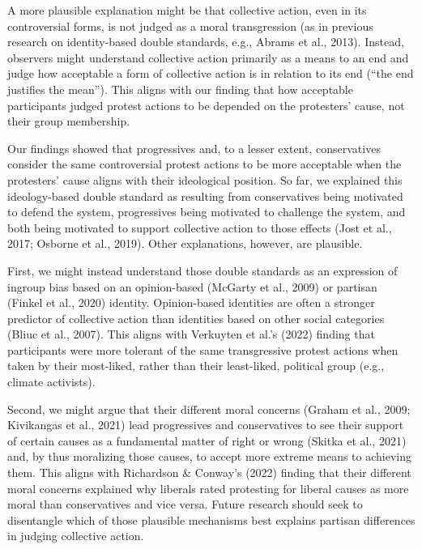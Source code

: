 \documentclass[12pt, letterpaper]{article}
\begin{document}
A more plausible explanation might be that collective action, even in
its controversial forms, is not judged as a moral transgression (as in
previous research on identity-based double standards, e.g., Abrams et
al., 2013). Instead, observers might understand collective action
primarily as a means to an end and judge how acceptable a form of
collective action is in relation to its end (``the end justifies the
mean''). This aligns with our finding that how acceptable participants
judged protest actions to be depended on the protesters' cause, not
their group membership.

Our findings showed that progressives and, to a lesser extent,
conservatives consider the same controversial protest actions to be more
acceptable when the protesters' cause aligns with their ideological
position. So far, we explained this ideology-based double standard as
resulting from conservatives being motivated to defend the system,
progressives being motivated to challenge the system, and both being
motivated to support collective action to those effects (Jost et al.,
2017; Osborne et al., 2019). Other explanations, however, are plausible.

First, we might instead understand those double standards as an
expression of ingroup bias based on an opinion-based (McGarty et al.,
2009) or partisan (Finkel et al., 2020) identity. Opinion-based
identities are often a stronger predictor of collective action than
identities based on other social categories (Bliuc et al., 2007). This
aligns with Verkuyten et al.'s (2022) finding that participants were
more tolerant of the same transgressive protest actions when taken by
their most-liked, rather than their least-liked, political group (e.g.,
climate activists).

Second, we might argue that their different moral concerns (Graham et
al., 2009; Kivikangas et al., 2021) lead progressives and conservatives
to see their support of certain causes as a fundamental matter of right
or wrong (Skitka et al., 2021) and, by thus moralizing those causes, to
accept more extreme means to achieving them. This aligns with Richardson
\& Conway's (2022) finding that their different moral concerns explained
why liberals rated protesting for liberal causes as more moral than
conservatives and vice versa. Future research should seek to disentangle
which of those plausible mechanisms best explains partisan differences
in judging collective action.
\end{document}
